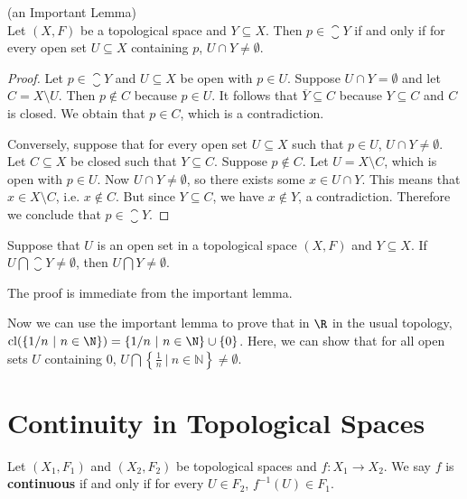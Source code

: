 \begin{lemma} (an Important Lemma)\\
Let $(X,F)$ be a topological space and $Y \subseteq X$. Then $ p \in \closure{Y}$ if and
only if for every open set $U\subseteq X$ containing $p$, $U \cap Y \neq\emptyset$.
\end{lemma}
\begin{proof}
 Let $p \in \closure{Y}$ and $U\subseteq X$ be open with $p \in U$. Suppose $U \cap Y = \emptyset$ and let $C=X\setminus U$. Then $p\notin C$ because $p \in U$. It follows that $\overline{Y} \subseteq C$ because $Y \subseteq C$ and $C$ is closed. We obtain that $p \in C$, which is a contradiction.

Conversely, suppose that for every open set $U\subseteq X$ such that $p \in U$, $U\cap Y \neq \emptyset$. Let $C\subseteq X$ be closed such that $Y \subseteq C$.   Suppose $p \notin C$. Let $U=X\setminus C$, which is open with $p \in U$. Now $U \cap Y \neq\emptyset$, so there exists some $x \in U \cap Y$. This means that $x\in X\setminus C$, i.e. $x \notin C$. But since $Y \subseteq C$, we have $x \notin Y$, a contradiction.  Therefore we conclude that $p \in \closure{Y}$.
\end{proof}

\begin{corollary}
 Suppose that $U$ is an open set in a topological space $(X,F)$ and $Y \subseteq X$. If $U \bigcap \closure{Y}\neq\emptyset$, then $U \bigcap Y \neq \emptyset$.
\end{corollary}

\proof The proof is immediate from the important lemma.

Now we can use the important lemma to prove that in $\R$ in the usual topology, $\mathrm{cl}(\{1/n\ |\ n\in\N\}) = \{1/n\ |\ n\in\N\}\cup\{0\}$.  Here, we can show that for all open sets $U$ containing 0, $U \bigcap\left\{ \frac{1}{n}\ |\ n \in \mathbb{N} \right\} \neq \emptyset$.


\section{Continuity in Topological Spaces}

\begin{definition}
Let $(X_1,F_1)$ and $(X_2,F_2)$ be topological spaces and $f: X_1 \to X_2$. We say $f$ is {\bf continuous} if and only if for every $U \in F_2$, $f^{-1}(U)\in F_1$.
\end{definition}

